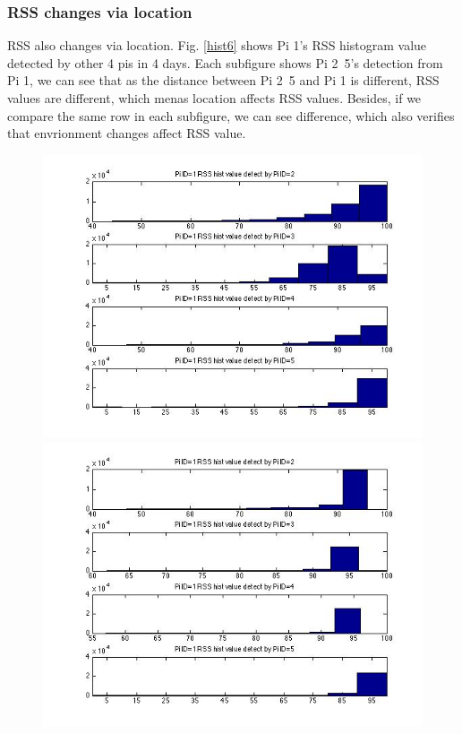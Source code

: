 \documentclass[10pt,conference]{IEEEtran}
\begin{document}
\subsubsection{RSS changes via location}
RSS also changes via location. Fig. \ref{hist6} shows Pi 1's RSS histogram value detected by other 4 pis in 4 days. Each subfigure shows Pi 2~5's detection from Pi 1, we can see that as the distance between Pi 2~5 and Pi 1 is different, RSS values are different, which menas location affects RSS values. Besides, if we compare the same row in each subfigure, we can see difference, which also verifies that envrionment changes affect RSS value. 

\begin{figure}[htbp]
\centering
\begin{minipage}[t]{0.2\textwidth}
	\centering
	\includegraphics[scale=0.2]{location0-1}
\end{minipage}
\begin{minipage}[t]{0.2\textwidth}
	\centering
	\includegraphics[scale=0.2]{location0-2}

\end{minipage}
\end{figure}
\end{document}
